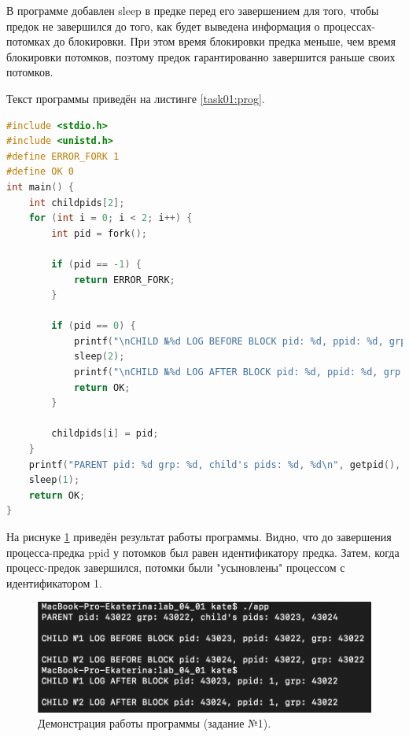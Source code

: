 \documentclass[12pt]{report}
\begin{document}
В программе добавлен sleep в предке перед его завершением для того, чтобы предок не завершился до того, как будет выведена информация о процессах-потомках до блокировки. При этом время блокировки предка меньше, чем время блокировки потомков, поэтому предок гарантированно завершится раньше своих потомков.

Текст программы приведён на листинге \ref{task01:prog}.

\begin{lstlisting}[label=task01:prog,caption=Процессы-сироты,language=C]
#include <stdio.h>
#include <unistd.h>
#define ERROR_FORK 1
#define OK 0
int main() {
    int childpids[2];
    for (int i = 0; i < 2; i++) {
        int pid = fork();

        if (pid == -1) {
            return ERROR_FORK;
        }

        if (pid == 0) {
            printf("\nCHILD №%d LOG BEFORE BLOCK pid: %d, ppid: %d, grp: %d\n", i + 1, getpid(), getppid(), getpgrp());
            sleep(2);
            printf("\nCHILD №%d LOG AFTER BLOCK pid: %d, ppid: %d, grp: %d\n", i + 1, getpid(), getppid(), getpgrp());
            return OK;
        }

        childpids[i] = pid;
    }
    printf("PARENT pid: %d grp: %d, child's pids: %d, %d\n", getpid(), getpgrp(), childpids[0], childpids[1]);
    sleep(1);
    return OK;
}
\end{lstlisting}

На риснуке \ref{task01:demo} приведён результат работы программы. Видно, что до завершения процесса-предка ppid у потомков был равен идентификатору предка. Затем, когда процесс-предок завершился, потомки были "усыновлены" процессом с идентификатором 1.  
\begin{figure}[H]

	\centering

	\includegraphics[width=\linewidth]{task01.png}
	\caption{Демонстрация работы программы (задание №1).}

	\label{task01:demo}

\end{figure}
\newpage
\end{document}
